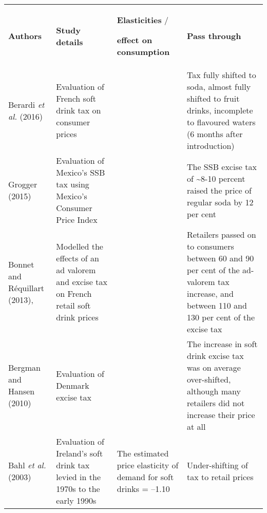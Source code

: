 \bgroup
\def\arraystretch{1.5}
\begin{tabularx}{\textwidth}{Xp{5cm}p{5cm}p{10cm}}
\toprule
\textbf{Authors} & \textbf{Study details} & \multicolumn{1}{p{5cm}}{\textbf{Elasticities} / 

\textbf{effect on consumption}} & \textbf{Pass through} \\
\cmidrule(lr){1-4}
Berardi \emph{et al.} (2016) & Evaluation of French soft drink tax on consumer prices & & Tax fully shifted to soda, almost fully shifted to fruit drinks, incomplete to flavoured waters (6 months after introduction) \\
Grogger (2015) & Evaluation of Mexico's SSB tax using Mexico's Consumer Price Index & & The SSB excise tax of \textasciitilde{}8-10 percent raised the price of regular soda by 12 per cent \\
Bonnet and R\'equillart (2013), & Modelled the effects of an ad valorem and excise tax on French retail soft drink prices & & Retailers passed on to consumers between 60 and 90 per cent of the ad-valorem tax increase, and between 110 and 130 per cent of the excise tax \\
Bergman and Hansen (2010) & Evaluation of Denmark excise tax & & The increase in soft drink excise tax was on average over-shifted, although many retailers did not increase their price at all \\
Bahl \emph{et al.} (2003) & Evaluation of Ireland's soft drink tax levied in the 1970s to the early 1990s & The estimated price elasticity of demand for soft drinks = --1.10 & Under-shifting of tax to retail prices \\
\bottomrule
\end{tabularx}
\egroup
